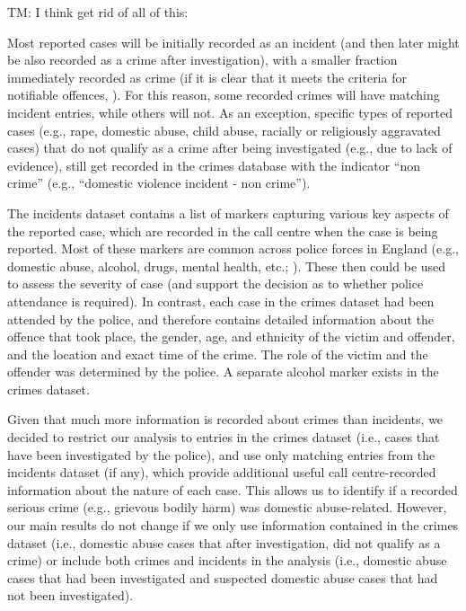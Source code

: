 \documentclass[12pt, a4paper]{article}
\newcommand{\TM}[1]{\textcolor{springgreen3}{TM: #1}}
\begin{document}
 \TM{ I think get rid of all of this:
 
Most reported cases will be initially recorded as an incident (and then later might be also recorded as a crime after investigation), with a smaller fraction immediately recorded as crime (if it is clear that it meets the criteria for notifiable offences, \citeNP{HomeOffice2019} \citeNP{HomeOffice2019}). For this reason, some recorded crimes will have matching incident entries, while others will not. As an exception, specific types of reported cases (e.g., rape, domestic abuse, child abuse, racially or religiously aggravated cases) that do not qualify as a crime after being investigated (e.g., due to lack of evidence), still get recorded in the crimes database with the indicator ``non crime'' (e.g., ``domestic violence incident - non crime'').


The incidents dataset contains a list of markers capturing various key aspects of the reported case, which are recorded in the call centre when the case is being reported. Most of these markers are common across police forces in England (e.g., domestic abuse, alcohol, drugs, mental health, etc.; \citeNP{HomeOffice2011}). 
These then could be used to assess the severity of case (and support the decision as to whether police attendance is required). 
In contrast, each case in the crimes dataset had been attended by the police, and therefore contains detailed information about the offence that took place, the gender, age, and ethnicity of the victim and offender, and the location and exact time of the crime. 
The role of the victim and the offender was determined by the police. 
A separate alcohol marker exists in the crimes dataset.

Given that much more information is recorded about crimes than incidents, we decided to restrict our analysis to entries in the crimes dataset (i.e., cases that have been investigated by the police), and use only matching entries from the incidents dataset (if any), which provide additional useful call centre-recorded information about the nature of each case. 
This allows us to identify if a recorded serious crime (e.g., grievous bodily harm) was domestic abuse-related. 
However, our main results do not change if we only use information contained in the crimes dataset (i.e., domestic abuse cases that after investigation, did not qualify as a crime) or include both crimes and incidents in the analysis (i.e., domestic abuse cases that had been investigated and suspected domestic abuse cases that had not been investigated).   

}
\end{document}
